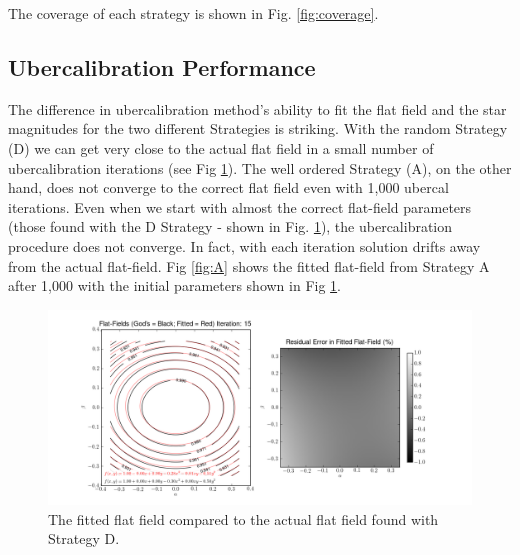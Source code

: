 \documentclass[manuscript]{aastex}
\begin{document}
The coverage of each strategy is shown in Fig. \ref{fig:coverage}.

\subsection{Ubercalibration Performance}

The difference in ubercalibration method's ability to fit the flat field and the star magnitudes for the two different Strategies is striking. With the random Strategy (D) we can get very close to the actual flat field in a small number of ubercalibration iterations (see Fig \ref{fig:D}). The well ordered Strategy (A), on the other hand, does not converge to the correct flat field even with 1,000 ubercal iterations. Even when we start with almost the correct flat-field parameters (those found with the D Strategy - shown in Fig. \ref{fig:D}), the ubercalibration procedure does not converge. In fact, with each iteration solution drifts away from the actual flat-field. Fig \ref{fig:A} shows the fitted flat-field from Strategy A after 1,000 with the initial parameters shown in Fig \ref{fig:D}.

\begin{figure}[ht]
\begin{center}
\includegraphics[width=\textwidth]{D_15_ff.png}
\end{center}
\caption{The fitted flat field compared to the actual flat field found with Strategy D. \label{fig:D}}
\end{figure}
\end{document}
